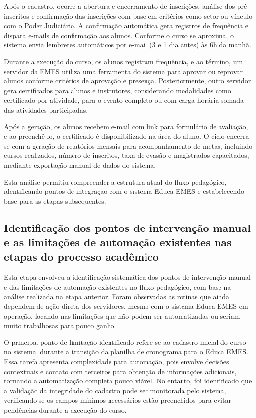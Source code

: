 Após o cadastro, ocorre a abertura e encerramento de inscrições,
análise dos pré-inscritos e confirmação das inscrições com base em
critérios como setor ou vínculo com o Poder Judiciário. A confirmação
automática gera registros de frequência e dispara e-mails de
confirmação aos alunos. Conforme o curso se aproxima, o sistema envia
lembretes automáticos por e-mail (3 e 1 dia antes) às 6h da manhã.

Durante a execução do curso, os alunos registram frequência, e ao
término, um servidor da EMES utiliza uma ferramenta do sistema para
aprovar ou reprovar alunos conforme critérios de aprovação e presença.
Posteriormente, outro servidor gera certificados para alunos e
instrutores, considerando modalidades como certificado por atividade,
para o evento completo ou com carga horária somada das atividades
participadas.

Após a geração, os alunos recebem e-mail com link para formulário de
avaliação, e ao preenchê-lo, o certificado é disponibilizado na área do
aluno. O ciclo encerra-se com a geração de relatórios mensais para
acompanhamento de metas, incluindo cursos realizados, número de
inscritos, taxa de evasão e magistrados capacitados, mediante
exportação manual de dados do sistema.

Esta análise permitiu compreender a estrutura atual do fluxo
pedagógico, identificando pontos de integração com o sistema Educa EMES
e estabelecendo base para as etapas subsequentes.

\subsection{Identificação dos pontos de intervenção manual e as limitações de automação existentes nas etapas do processo acadêmico}
\label{sec:metod:etapas:intervencao_manual}

Esta etapa envolveu a identificação sistemática dos pontos de
intervenção manual e das limitações de automação existentes no fluxo
pedagógico, com base na análise realizada na etapa anterior. Foram
observadas as rotinas que ainda dependem de ação direta dos servidores,
mesmo com o sistema Educa EMES em operação, focando nas limitações que
não podem ser automatizadas ou seriam muito trabalhosas para pouco
ganho.

O principal ponto de limitação identificado refere-se ao cadastro
inicial do curso no sistema, durante a transição da planilha de
cronograma para o Educa EMES. Essa tarefa apresenta complexidade para
automação, pois envolve decisões contextuais e contato com terceiros
para obtenção de informações adicionais, tornando a automatização
completa pouco viável. No entanto, foi identificado que a validação da
integridade do cadastro pode ser monitorada pelo sistema, verificando
se os campos mínimos necessários estão preenchidos para evitar
pendências durante a execução do curso.

